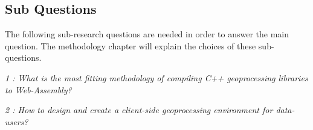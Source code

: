 







\subsection*{Sub Questions}

The following sub-research questions are needed in order to answer the main question. The methodology chapter will explain the choices of these sub-questions. 


\textit{1 : What is the most fitting methodology of compiling C++ geoprocessing libraries to Web-Assembly?}

\textit{2 : How to design and create a client-side geoprocessing environment for data-users?}

